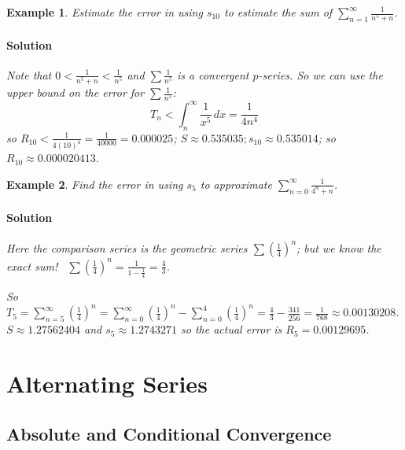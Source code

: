 \documentclass[letterpaper, 11pt, openany]{book}
\theoremstyle{mytheoremstyle}
\theoremstyle{myexamplestyle}
\newtheorem{example}{Example}[section]
\newenvironment{solution}{\paragraph{\sffamily \smaller \fontseries{b}\selectfont Solution}}{\hfill\faSquare}
\begin{document}
\begin{example}\label{e:seriescomptestestsumrational}
    Estimate the error in using $s_{10}$ to estimate the sum of $\displaystyle \sum_{n = 1}^{\infty} \frac{1}{n^{5} + n}$.
    
    \begin{solution}
        Note that $0 < \frac{1}{n^{5} + n} < \frac{1}{n^{5}}$ and $\sum \frac{1}{n^{5}}$ is a convergent $p$-series. So we can use the upper bound on the error for $\sum \frac{1}{n^{5}}$:
        \[T_{n} < \int_{n}^{\infty} \frac{1}{x^{5}} \, dx = \frac{1}{4n^{4}}\]
        so $R_{10} < \frac{1}{4(10)^{4}} = \frac{1}{40000} = 0.000025$; $S \approx 0.535035; s_{10} \approx 0.535014$; so $R_{10} \approx 0.000020413$.
    \end{solution}
\end{example}

\begin{example}\label{e:seriescomptestestsumexp}
    Find the error in using $s_{5}$ to approximate $\displaystyle \sum_{n=0}^{\infty} \frac{1}{4^{n} + n}$.
    
    \begin{solution}
        Here the comparison series is the geometric series $\sum \left( \frac{1}{4} \right)^{n}$; but we know the exact sum! \faThumbsUp \ $\sum \left( \frac{1}{4} \right)^{n} = \frac{1}{1-\frac{1}{4}} = \frac{4}{3}$.
        
        So $T_{5} = \displaystyle \sum_{n=5}^{\infty} \left( \frac{1}{4} \right)^{n} = \sum_{n=0}^{\infty} \left( \frac{1}{4} \right)^{n} - \sum_{n=0}^{4} \left( \frac{1}{4} \right)^{n} = \frac{4}{3} - \frac{341}{256} = \frac{1}{768} \approx 0.00130208$. $S \approx 1.27562404$ and $s_{5} \approx 1.2743271$ so the actual error is $R_{5} = 0.00129695$.
    \end{solution}
\end{example}

\section{Alternating Series}
\setcounter{figure}{0}
\subsection{Absolute and Conditional Convergence}
\end{document}

